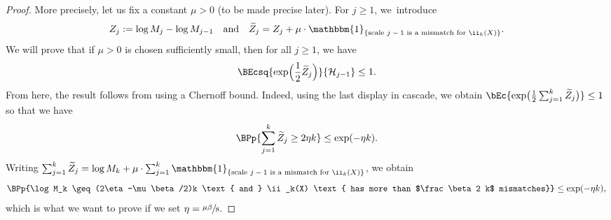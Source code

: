 \begin{proof}
More precisely, let us fix a constant $\mu>0$ (to be made precise later). For $j \geq 1$, we~introduce
\begin{align*}
Z_j := \log M_j - \log M_{j-1} \quad \text{and} \quad \widetilde{Z}_j= Z_j + \mu\cdot \mathbbm{1}_{\{\text{scale $j-1$ is a mismatch for $\ii_k(X)$}\}}.
\end{align*}
We will prove that if $\mu>0$ is chosen sufficiently small, then for all $j\geq 1$, we have
\begin{align}\label{eq:small exponential moment tilde Zk}
\BEcsq{\exp\Bigl(\frac12\widetilde{Z}_j\Bigr)}{\mathcal H_{j-1}} \leq 1.
\end{align}
From here, the result follows from using a Chernoff bound. Indeed, using the last display in cascade, we obtain $\bEc{\exp \bigl(\frac{1}{2} \sum_{j=1}^{k}\widetilde{Z}_j \bigr)}\leq 1$ so that we have
\begin{align*}
\BPp{\sum_{j=1}^{k}\widetilde{Z}_j \geq 2 \eta k}\leq \exp(-\eta k).
\end{align*}
Writing $\sum_{j=1}^{k}\widetilde{Z}_j= \log M_k + \mu\cdot \sum_{j=1}^{k}\mathbbm{1}_{\{\text{scale $j-1$ is a mismatch for $\ii_k(X)$}\}}$, we obtain
\[
\BPp{\log M_k \geq (2\eta -\mu \beta/2)k \text{ and } \ii_k(X) \text{ has more than $\frac\beta2 k$ mismatches}} \leq \exp(-\eta k),
\]
which is what we want to prove if we set $\eta=\sfrac{\mu\beta}{8}$.


\end{proof}
